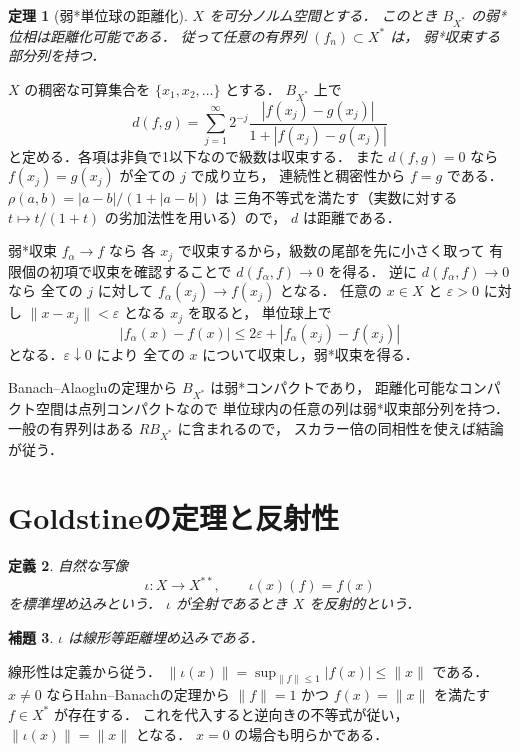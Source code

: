 \documentclass[a5paper,10pt,onecolumn]{jsarticle}
\makeatletter
\theoremstyle{mathnotetheorem}
\newtheorem{theorem}{定理}[section]
\newtheorem{definition}[theorem]{定義}
\newtheorem{lemma}[theorem]{補題}
\renewcommand{\proofname}{証明}
\renewenvironment{proof}[1][\proofname]{%
  \par\pushQED{\qed}\normalfont\topsep4\p@\@plus2\p@\relax
  \trivlist\item[\hskip\labelsep\bfseries #1]\ignorespaces
}{\popQED\endtrivlist\@endpefalse}
\newcommand{\norm}[1]{\lVert #1\rVert}
\makeatother
\begin{document}
\begin{theorem}[弱*単位球の距離化]\label{thm:metrizable}
$X$ を可分ノルム空間とする．
このとき $B_{X^*}$ の弱*位相は距離化可能である．
従って任意の有界列 $(f_n)\subset X^*$ は，
弱*収束する部分列を持つ．
\end{theorem}
\begin{proof}
$X$ の稠密な可算集合を
$\{x_1,x_2,\dots\}$ とする．
$B_{X^*}$ 上で
\[
 d(f,g)=\sum_{j=1}^\infty2^{-j}
 \frac{|f(x_j)-g(x_j)|}{1+|f(x_j)-g(x_j)|}
\]
と定める．各項は非負で1以下なので級数は収束する．
また $d(f,g)=0$ なら
$f(x_j)=g(x_j)$ が全ての $j$ で成り立ち，
連続性と稠密性から $f=g$ である．
$\rho(a,b)=|a-b|/(1+|a-b|)$ は
三角不等式を満たす（実数に対する
$t\mapsto t/(1+t)$ の劣加法性を用いる）ので，
$d$ は距離である．

弱*収束 $f_\alpha\to f$ なら
各 $x_j$ で収束するから，級数の尾部を先に小さく取って
有限個の初項で収束を確認することで
$d(f_\alpha,f)\to0$ を得る．
逆に $d(f_\alpha,f)\to0$ なら
全ての $j$ に対して
$f_\alpha(x_j)\to f(x_j)$ となる．
任意の $x\in X$ と $\varepsilon>0$ に対し
$\norm{x-x_j}<\varepsilon$ となる $x_j$ を取ると，
単位球上で
\[
 |f_\alpha(x)-f(x)|
 \le2\varepsilon+|f_\alpha(x_j)-f(x_j)|
\]
となる．$\varepsilon\downarrow0$ により
全ての $x$ について収束し，弱*収束を得る．

Banach--Alaogluの定理から $B_{X^*}$ は弱*コンパクトであり，
距離化可能なコンパクト空間は点列コンパクトなので
単位球内の任意の列は弱*収束部分列を持つ．
一般の有界列はある $R B_{X^*}$ に含まれるので，
スカラー倍の同相性を使えば結論が従う．
\end{proof}

\section{Goldstineの定理と反射性}

\begin{definition}
自然な写像
\[
 \iota:X\to X^{**},\qquad \iota(x)(f)=f(x)
\]
を\emph{標準埋め込み}という．
$\iota$ が全射であるとき $X$ を\emph{反射的}という．
\end{definition}

\begin{lemma}\label{lem:canonical-isometry}
$\iota$ は線形等距離埋め込みである．
\end{lemma}
\begin{proof}
線形性は定義から従う．
$\norm{\iota(x)}
 =\sup_{\norm f\le1}|f(x)|\le\norm x$ である．
$x\ne0$ ならHahn--Banachの定理から
$\norm f=1$ かつ $f(x)=\norm x$ を満たす
$f\in X^*$ が存在する．
これを代入すると逆向きの不等式が従い，
$\norm{\iota(x)}=\norm x$ となる．
$x=0$ の場合も明らかである．
\end{proof}
\end{document}
